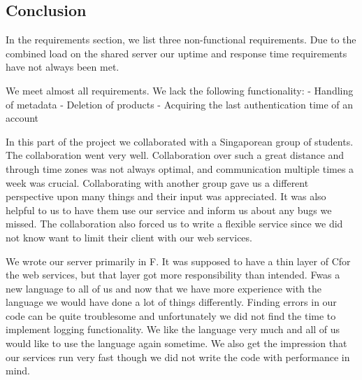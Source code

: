 \subsection{Conclusion}
\label{serverconclusion}
In the requirements section, we list three non-functional requirements. Due to the combined load on the shared server our uptime and response time requirements have not always been met.

We meet almost all requirements. We lack the following functionality:
- Handling of metadata
- Deletion of products
- Acquiring the last authentication time of an account

In this part of the project we collaborated with a Singaporean group of students. The collaboration went very well. Collaboration over such a great distance and through time zones was not always optimal, and communication multiple times a week was crucial.
Collaborating with another group gave us a different perspective upon many things and their input was appreciated. It was also helpful to us to have them use our service and inform us about any bugs we missed.
The collaboration also forced us to write a flexible service since we did not know want to limit their client with our web services.

We wrote our server primarily in F\Sh. It was supposed to have a thin layer of C\Sh for the web services, but that layer got more responsibility than intended. 
F\Sh was a new language to all of us and now that we have more experience with the language we would have done a lot of things differently. Finding errors in our code can be quite troublesome and unfortunately we did not find the time to implement logging functionality. We like the language very much and all of us would like to use the language again sometime. We also get the impression that our services run very fast though we did not write the code with performance in mind.
\newpage
